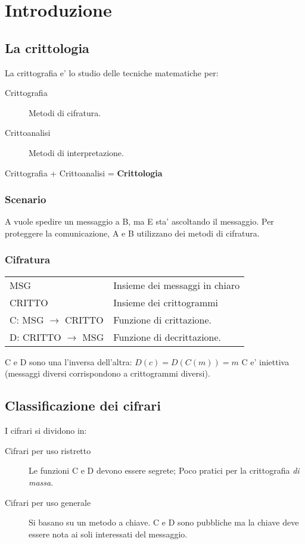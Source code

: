 \chapter{Introduzione}
\section{La crittologia}
La crittografia e' lo studio delle tecniche matematiche per:
\begin{description}
    \item[Crittografia] Metodi di cifratura.
    \item[Crittoanalisi] Metodi di interpretazione. 
\end{description}
\begin{center}
    Crittografia + Crittoanalisi = \textbf{Crittologia}
\end{center}
\subsection{Scenario}
A vuole spedire un messaggio a B, ma E sta' ascoltando il messaggio.
Per proteggere la comunicazione, A e B utilizzano dei metodi di cifratura.
\subsection{Cifratura}

\begin{tabular}{l | l}
    MSG & Insieme dei messaggi in chiaro\\
    CRITTO & Insieme dei crittogrammi\\
    C: MSG $\rightarrow$ CRITTO & Funzione di crittazione.\\
    D: CRITTO $\rightarrow$ MSG & Funzione di decrittazione.
\end{tabular}

C e D sono una l'inversa dell'altra: $D(c) = D(C(m)) = m$\newline
C e' iniettiva (messaggi diversi corrispondono a crittogrammi diversi).
\section{Classificazione dei cifrari}
I cifrari si dividono in:
\begin{description}
    \item[Cifrari per uso ristretto] Le funzioni C e D devono essere {\color{red}segrete}; Poco pratici per la crittografia \textit{di massa}.
    \item[Cifrari per uso generale] Si basano su un metodo a {\color{blue}chiave}. C e D sono pubbliche ma la chiave deve essere nota ai soli interessati del messaggio.
\end{description}
